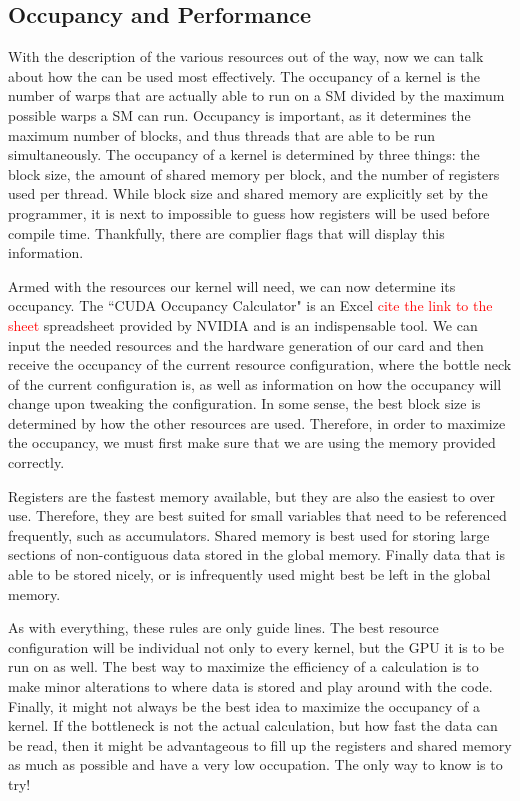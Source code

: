 \documentclass[12pt]{report}
\newcommand{\notetodylan}[1]{\textcolor{red}{#1}} %
\begin{document}
\subsection{Occupancy and Performance}
\label{sec:gpuocc}
With the description of the various resources out of the way, now we can talk about how the can be used most effectively. The occupancy of a kernel is the number of warps that are actually able to run on a SM divided by the maximum possible warps a SM can run. Occupancy is important, as it determines the maximum number of blocks, and thus threads that are able to be run simultaneously. The occupancy of a kernel is determined by three things: the block size, the amount of shared memory per block, and the number of registers used per thread. While block size and shared memory are explicitly set by the programmer, it is next to impossible to guess how registers will be used before compile time. Thankfully, there are complier flags that will display this information.

Armed with the resources our kernel will need, we can now determine its occupancy. The ``CUDA Occupancy Calculator" is an Excel \notetodylan{cite the link to the sheet} spreadsheet provided by NVIDIA and is an indispensable tool. We can input the needed resources and the hardware generation of our card and then receive the occupancy of the current resource configuration, where the bottle neck of the current configuration is, as well as information on how the occupancy will change upon tweaking the configuration. In some sense, the best block size is determined by how the other resources are used. Therefore, in order to maximize the occupancy, we must first make sure that we are using the memory provided correctly.

Registers are the fastest memory available, but they are also the easiest to over use. Therefore, they are best suited for small variables that need to be referenced frequently, such as accumulators. Shared memory is best used for storing large sections of non-contiguous data stored in the global memory. Finally data that is able to be stored nicely, or is infrequently used might best be left in the global memory.

As with everything, these rules are only guide lines. The best resource configuration will be individual not only to every kernel, but the GPU it is to be run on as well. The best way to maximize the efficiency of a calculation is to make minor alterations to where data is stored and play around with the code. Finally, it might not always be the best idea to maximize the occupancy of a kernel. If the bottleneck is not the actual calculation, but how fast the data can be read, then it might be advantageous to fill up the registers and shared memory as much as possible and have a very low occupation. The only way to know is to try!
\end{document}
